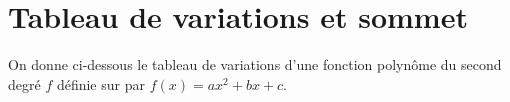 \documentclass[11pt,a4paper]{book}
\begin{document}
\section*{\color{green!55!black}Tableau de variations et sommet}

\exerciceDS{}

On donne ci-dessous le tableau de variations d'une fonction polynôme du second degré $f$ définie sur \R par $f(x)=ax^2+bx+c$.

\begin{center}
\end{center}
\end{document}
